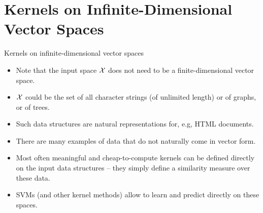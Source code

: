 \section{Kernels on Infinite-Dimensional Vector Spaces}

\begin{vbframe}{Kernels on infinite-dimensional vector spaces}

  \begin{itemize}
    \item Note that the input space $\mathcal{X}$ does not need to be a finite-dimensional
    vector space.
    \item $\mathcal{X}$ could be the set of all character strings (of unlimited length) or 
       of graphs, or of trees.
    \item Such data structures are natural representations for, e.g, HTML documents.
    \item There are many examples of data that do not naturally come in vector
    form.
    \item Most often meaningful and cheap-to-compute kernels can be defined
    directly on the input data structures -- they simply define a similarity measure over these data.
    \item SVMs (and other kernel methods) allow to learn and predict
    directly on these spaces.
  \end{itemize}


\end{vbframe}


\endlecture
